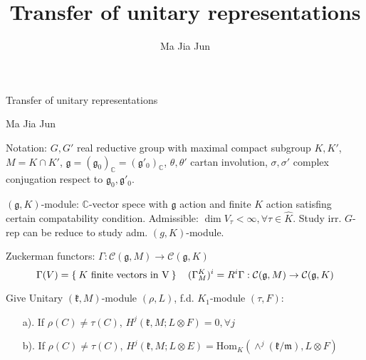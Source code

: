 \documentclass{beamer}
\title{Transfer of unitary representations}
\author{Ma Jia Jun}
\begin{document}
\color{white}

\def\gg{{\mathfrak{g}}}
\def\kk{{\mathfrak{k}}}
\def\pp{{\mathfrak{p}}}
\def\qq{{\mathfrak{q}}}
\def\oo{{\mathfrak{o}}}
\def\mm{{\mathfrak{m}}}
\def\bC{{\mathbb{C}}}
\def\bR{{\mathbb{R}}}
\def\hK{{\widehat{K}}}
\def\cC{{\mathcal{C}}}
\def\Hom{\mathrm{Hom}}
\def\inn#1#2{\left\langle{#1},{#2}\right\rangle}
\def\innc#1#2{\left({#1},{#2}\right)}

\begin{frame}[t]
\begin{center} 
\large Transfer of unitary representations
\end{center}
\begin{center}
 Ma Jia Jun
\end{center}
\end{frame}


\begin{frame}[t]
Notation: $G,G'$ real reductive group with maximal compact subgroup
$K,K'$, $M=K\cap K'$,
$\gg=(\gg_0)_\bC=(\gg'_0)_\bC$, $\theta,\theta'$ cartan involution,
$\sigma,\sigma'$ complex conjugation respect to $\gg_0, \gg'_0$.
\end{frame}

\begin{frame}[t] $(\gg,K)$-module: $\bC$-vector spece with $\gg$ action and finite $K$ action
satisfing certain compatability condition. Admissible:
$\dim V_\tau < \infty, \forall \tau\in \hK$. Study irr. $G$-rep can be reduce to study adm. $(g,K)$-module.
\end{frame}

\begin{frame}[t]
Zuckerman functors: $\Gamma:\cC(\gg,M)\to \cC(\gg,K)$ 
\[
\Gamma(V) = \Set{K\text{ finite vectors in V}}
\quad
(\Gamma_M^K)^i=R^i\Gamma: \cC(\gg,M)\to \cC(\gg,K)
\]
\end{frame}

\begin{frame}[t]
Give Unitary $(\kk,M)$-module $(\rho,L)$, f.d. $K_1$-module 
$(\tau,F)$:
\begin{itemize}
\item[\color{white} a).] \color{white} If $\rho(C) \neq \tau(C)$, 
$H^j(\kk,M; L\otimes F)=0, \forall j$
\item[\color{white} b).] \color{white} If $\rho(C) \neq \tau(C)$, 
   $H^j(\kk,M; L\otimes E) =\Hom_K(\wedge^j(\kk/\mm),L\otimes F)$
\end{itemize}
\end{frame}
\end{document}

